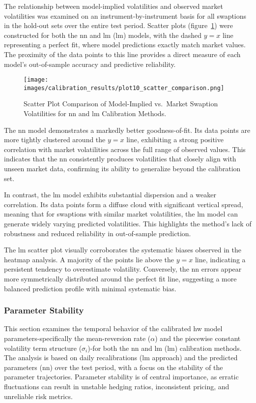 The relationship between model-implied volatilities and observed market volatilities was examined on an instrument-by-instrument basis for all swaptions in the hold-out sets over the entire test period. Scatter plots (figure~\ref{fig:scatter_comparison}) were constructed for both the \ac{nn} and \ac{lm} (\ac{lm}) models, with the dashed \(y=x\) line representing a perfect fit, where model predictions exactly match market values. The proximity of the data points to this line provides a direct measure of each model's out-of-sample accuracy and predictive reliability.

\begin{figure}[H]
	\centering
	\texttt{[image: images/calibration\_results/plot10\_scatter\_comparison.png]}
	\caption{Scatter Plot Comparison of Model-Implied vs.\ Market Swaption Volatilities for \ac{nn} and \ac{lm} Calibration Methods.}
	\label{fig:scatter_comparison}
\end{figure}

The \ac{nn} model demonstrates a markedly better goodness-of-fit. Its data points are more tightly clustered around the \(y=x\) line, exhibiting a strong positive correlation with market volatilities across the full range of observed values. This indicates that the \ac{nn} consistently produces volatilities that closely align with unseen market data, confirming its ability to generalize beyond the calibration set.

In contrast, the \ac{lm} model exhibits substantial dispersion and a weaker correlation. Its data points form a diffuse cloud with significant vertical spread, meaning that for swaptions with similar market volatilities, the \ac{lm} model can generate widely varying predicted volatilities. This highlights the method's lack of robustness and reduced reliability in out-of-sample prediction.

The \ac{lm} scatter plot visually corroborates the systematic biases observed in the heatmap analysis. A majority of the points lie above the \(y=x\) line, indicating a persistent tendency to overestimate volatility. Conversely, the \ac{nn} errors appear more symmetrically distributed around the perfect fit line, suggesting a more balanced prediction profile with minimal systematic bias.

\subsubsection{Parameter Stability}
This section examines the temporal behavior of the calibrated \ac{hw} model parameters-specifically the mean-reversion rate (\(\alpha\)) and the piecewise constant volatility term structure (\(\sigma_i\))-for both the \ac{nn} and \ac{lm} (\ac{lm}) calibration methods. The analysis is based on daily recalibrations (\ac{lm} approach) and the predicted parameters (\ac{nn}) over the test period, with a focus on the stability  of the parameter trajectories. Parameter stability is of central importance, as erratic fluctuations can result in unstable hedging ratios, inconsistent pricing, and unreliable risk metrics.

